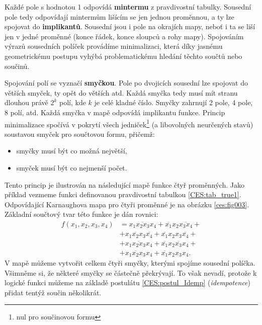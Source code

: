      Každé pole s hodnotou 1 odpovídá \textbf{mintermu} z pravdivostní tabulky. Sousední pole tedy 
     odpovídají mintermům lišícím se jen jednou proměnnou, a ty lze spojovat do 
     \textbf{implikantů}. Sousední jsou i pole na okrajích mapy, neboť i ta se liší
     jen v jedné proměnné (konce řádek, konce sloupců a rohy mapy). Spojováním výrazů sousedních 
     políček provádíme minimalizaci, která díky jasnému geometrickému postupu vyhýbá 
     problematickému hledání těchto součtů nebo součinů. 
     
     Spojování polí se vyznačí \textbf{smyčkou}. Pole po dvojicích sousední lze spojovat do větších 
     smyček, ty opět do větších atd. Každá smyčka tedy musí mít stranu dlouhou právě $2^k$ polí, 
     kde $k$  je celé kladné číslo. Smyčky zahrnují 2 pole, 4 pole, 8 polí, atd. Každá smyčka v 
     mapě odpovídá implikantu funkce. Princip minimalizace spočívá v pokrytí všech     
     jedniček\footnote{nul pro součinovou formu} (a libovolných neurčených stavů) soustavou smyček 
     pro součtovou formu, přičemž:
     \begin{itemize}[noitemsep]
       \item smyčky musí být co možná největší,
       \item smyček musí být co nejmenší počet.       
     \end{itemize}     
     Tento princip je ilustrován na následující mapě funkce čtyř proměnných. Jako příklad vezmeme 
     funkci definovanou pravdivostní tabulkou \ref{CES:tab_true1}. Odpovídající Karnaughova mapa 
     pro čtyři proměnné je na obrázku \ref{ces:fig003}. Základní součtový tvar této funkce je 
     dán rovnici:     
     \begin{align}
        f(x_1, x_2, x_3, x_4) 
          &= \overline{x_1x_2x_3x_4} + \overline{x_1}x_2\overline{x_3x_4} +           \nonumber \\
          &+ x_1\overline{x_2}x_3\overline{x_4} + \overline{x_1}x_2x_3\overline{x_4}+ \nonumber \\ 
          &+ x_1\overline{x_2x_3}x_4 + \overline{x_1}x_2\overline{x_3}x_4 +           \nonumber \\ 
          &+ x_1\overline{x_2}x_3x_4 + \overline{x_1}x_2x_3x_4.                          
     \end{align}
     V mapě můžeme vytvořit celkem čtyři smyčky, kterými spojíme sousední políčka. Všimněme si, že 
     některé smyčky se částečně překrývají. To však nevadí, protože k logické funkci můžeme na 
     základě postulátu \ref{CES:postul_Idemp} (\emph{idempotence})
     přidat tentýž součin několikrát. 
     
